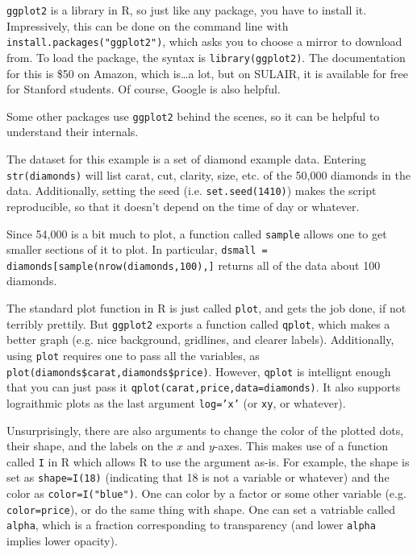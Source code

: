 \label{dendrogram}
\texttt{ggplot2} is a library in R, so just like any package, you have to install it. Impressively, this can be done on the command line with \texttt{install.packages("ggplot2")}, which asks you to choose a mirror to download from. To load the package, the syntax is \texttt{library(ggplot2)}. The documentation for this is \$50 on Amazon, which is\dots a lot, but on SULAIR, it is available for free for Stanford students. Of course, Google is also helpful.

Some other packages use \texttt{ggplot2} behind the scenes, so it can be helpful to understand their internals.

The dataset for this example is a set of diamond example data. Entering \texttt{str(diamonds)} will list carat, cut, clarity, size, etc. of the 50,000 diamonds in the data. Additionally, setting the seed (i.e. \texttt{set.seed(1410)}) makes the script reproducible, so that it doesn't depend on the time of day or whatever.

Since 54,000 is a bit much to plot, a function called \texttt{sample} allows one to get smaller sections of it to plot. In particular, \texttt{dsmall = diamonds[sample(nrow(diamonds,100),]} returns all of the data about 100 diamonds.

The standard plot function in R is just called \texttt{plot}, and gets the job done, if not terribly prettily. But \texttt{ggplot2} exports a function called \texttt{qplot}, which makes a better graph (e.g. nice background, gridlines, and clearer labels). Additionally, using \texttt{plot} requires one to pass all the variables, as \texttt{plot(diamonds\$carat,diamonds\$price)}. However, \texttt{qplot} is intellignt enough that you can just pass it \texttt{qplot(carat,price,data=diamonds)}. It also supports lograithmic plots as the last argument \texttt{log='x'} (or \texttt{xy}, or whatever).

Unsurprisingly, there are also arguments to change the color of the plotted dots, their shape, and the labels on the $x$ and $y$-axes. This makes use of a function called \texttt{I} in R which allows R to use the argument as-is. For example, the shape is set as \texttt{shape=I(18)} (indicating that 18 is not a variable or whatever) and the color as \texttt{color=I("blue")}. One can color by a factor or some other variable (e.g. \texttt{color=price}), or do the same thing with shape. One can set a vatriable called \texttt{alpha}, which is a fraction corresponding to transparency (and lower \texttt{alpha} implies lower opacity).

